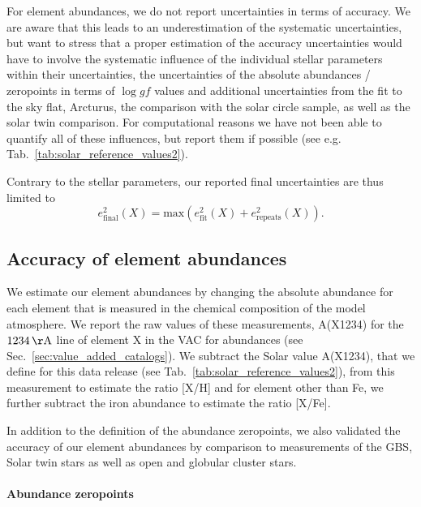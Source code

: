 \documentclass[fleqn,usenatbib,useAMS]{mnras}
\begin{document}
For element abundances, we do not report uncertainties in terms of accuracy. We are aware that this leads to an underestimation of the systematic uncertainties, but want to stress that a proper estimation of the accuracy uncertainties would have to involve the systematic influence of the individual stellar parameters within their uncertainties, the uncertainties of the absolute abundances / zeropoints in terms of $\log gf$ values and additional uncertainties from the fit to the sky flat, Arcturus, the comparison with the solar circle sample, as well as the solar twin comparison. For computational reasons we have not been able to quantify all of these influences, but report them if possible (see e.g. Tab.~\ref{tab:solar_reference_values2}).

Contrary to the stellar parameters, our reported final uncertainties are thus limited to 
\begin{equation}
e_\text{final}^2 (X) = \text{max} \left(e_\text{fit}^2(X) + e_\text{repeats}^2(X) \right). \label{eq:final_error_abundances}
\end{equation}

\subsection{Accuracy of element abundances} \label{sec:accuracy_abundances}

We estimate our element abundances by changing the absolute abundance for each element that is measured in the chemical composition of the model atmosphere. We report the raw values of these measurements, A(X1234) for the $1234\,\mathrm{\AA}$ line of element X in the VAC for abundances (see Sec.~\ref{sec:value_added_catalogs}). We subtract the Solar value A(X1234), that we define for this data release (see Tab.~\ref{tab:solar_reference_values2}), from this measurement to estimate the ratio [X/H] and for element other than Fe, we further subtract the iron abundance to estimate the ratio [X/Fe].

In addition to the definition of the abundance zeropoints, we also validated the accuracy of our element abundances by comparison to measurements of the GBS, Solar twin stars as well as open and globular cluster stars.

\paragraph*{Abundance zeropoints}
\end{document}
